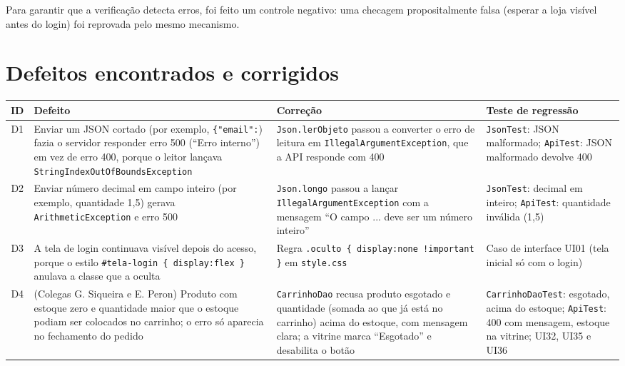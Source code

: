 \documentclass[12pt]{article}
\begin{document}
Para garantir que a verificação detecta erros, foi feito um controle negativo: uma checagem propositalmente falsa (esperar a loja visível antes do login) foi reprovada pelo mesmo mecanismo.

\section{Defeitos encontrados e corrigidos}
\label{sec:defeitos}

\begin{table}[H]
\centering\small\renewcommand{\arraystretch}{1.3}
\begin{tabular}{|c|p{4.0cm}|p{3.5cm}|p{3.5cm}|}
\hline
\rowcolor{gray!30} \textbf{ID} & \textbf{Defeito} & \textbf{Correção} & \textbf{Teste de regressão} \\ \hline
D1 & Enviar um JSON cortado (por exemplo, \texttt{\{"email":}) fazia o servidor responder erro 500 (``Erro interno'') em vez de erro 400, porque o leitor lançava \texttt{String\-Index\-Out\-Of\-Bounds\-Exception} & \texttt{Json.\-lerObjeto} passou a converter o erro de leitura em \texttt{Illegal\-Argument\-Exception}, que a API responde com 400 & \texttt{Json\-Test}: JSON malformado; \texttt{Api\-Test}: JSON malformado devolve 400 \\ \hline
D2 & Enviar número decimal em campo inteiro (por exemplo, quantidade 1,5) gerava \texttt{Arithmetic\-Exception} e erro 500 & \texttt{Json.longo} passou a lançar \texttt{Illegal\-Argument\-Exception} com a mensagem ``O campo ... deve ser um número inteiro'' & \texttt{Json\-Test}: decimal em inteiro; \texttt{Api\-Test}: quantidade inválida (1,5) \\ \hline
D3 & A tela de login continuava visível depois do acesso, porque o estilo \texttt{\#tela-login \{ display:flex \}} anulava a classe que a oculta & Regra \texttt{.oculto \{ display:none !important \}} em \texttt{style.css} & Caso de interface UI01 (tela inicial só com o login) \\ \hline
D4 & (Colegas G. Siqueira e E. Peron) Produto com estoque zero e quantidade maior que o estoque podiam ser colocados no carrinho; o erro só aparecia no fechamento do pedido & \texttt{Carrinho\-Dao} recusa produto esgotado e quantidade (somada ao que já está no carrinho) acima do estoque, com mensagem clara; a vitrine marca ``Esgotado'' e desabilita o botão & \texttt{Carrinho\-Dao\-Test}: esgotado, acima do estoque; \texttt{Api\-Test}: 400 com mensagem, estoque na vitrine; UI32, UI35 e UI36 \\ \hline

\end{tabular}
\end{table}
\end{document}

